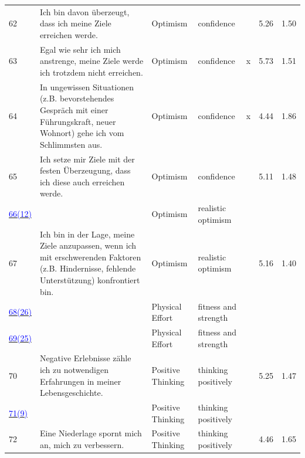 \documentclass[
  man,floatsintext]{apa7}
\begin{document}
\begin{center}
\begin{ThreePartTable}
{\begin{longtable}{m{0.6cm}m{7.3cm}m{2.2cm}m{2.2cm}m{0.2cm}m{0.4cm}m{0.4cm}}
62 & Ich bin davon überzeugt, dass ich meine Ziele erreichen werde. & Optimism & confidence &  & 5.26 & 1.50\\
63 & Egal wie sehr ich mich anstrenge, meine Ziele werde ich trotzdem nicht erreichen. & Optimism & confidence & x & 5.73 & 1.51\\
64 & In ungewissen Situationen (z.B. bevorstehendes Gespräch mit einer Führungskraft, neuer Wohnort) gehe ich vom Schlimmsten aus. & Optimism & confidence & x & 4.44 & 1.86\\
65 & Ich setze mir Ziele mit der festen Überzeugung, dass ich diese auch erreichen werde. & Optimism & confidence &  & 5.11 & 1.48\\
\label{optim_2_211_r}\hyperref[table1]{\textcolor{blue}{66(12)}} & \cellcolor{lightgray}{In unbekannten Situationen bleibe ich zuversichtlich und sage mir „Es wird schon gutgehen“.} & Optimism & realistic optimism & \cellcolor{lightgray}{x} & \cellcolor{lightgray}{5.09} & \cellcolor{lightgray}{1.49}\\
67 & Ich bin in der Lage, meine Ziele anzupassen, wenn ich mit erschwerenden Faktoren (z.B. Hindernisse, fehlende Unterstützung) konfrontiert bin. & Optimism & realistic optimism &  & 5.16 & 1.40\\
\label{physi_1_263}\hyperref[table1]{\textcolor{blue}{68(26)}} & \cellcolor{lightgray}{Ich gehe mehr als einmal in der Woche einer sportlichen Aktivität nach (z.B. Joggen, Gewichte heben).} & Physical Effort & fitness and strength & \cellcolor{lightgray}{\ } & \cellcolor{lightgray}{4.56} & \cellcolor{lightgray}{2.30}\\
\label{physi_1_264}\hyperref[table1]{\textcolor{blue}{69(25)}} & \cellcolor{lightgray}{In den letzten 6 Monaten habe ich mich regelmäßig sportlich betätigt.} & Physical Effort & fitness and strength & \cellcolor{lightgray}{\ } & \cellcolor{lightgray}{4.76} & \cellcolor{lightgray}{2.10}\\
70 & Negative Erlebnisse zähle ich zu notwendigen Erfahrungen in meiner Lebensgeschichte. & Positive Thinking & thinking positively &  & 5.25 & 1.47\\
\label{posit_1_167}\hyperref[table1]{\textcolor{blue}{71(9)}} & \cellcolor{lightgray}{Ich sehe Hindernisse als eine Chance, zu wachsen.} & Positive Thinking & thinking positively & \cellcolor{lightgray}{\ } & \cellcolor{lightgray}{4.97} & \cellcolor{lightgray}{1.48}\\
72 & Eine Niederlage spornt mich an, mich zu verbessern. & Positive Thinking & thinking positively &  & 4.46 & 1.65\\

\end{longtable}}
\end{ThreePartTable}
\end{center}
\end{document}

